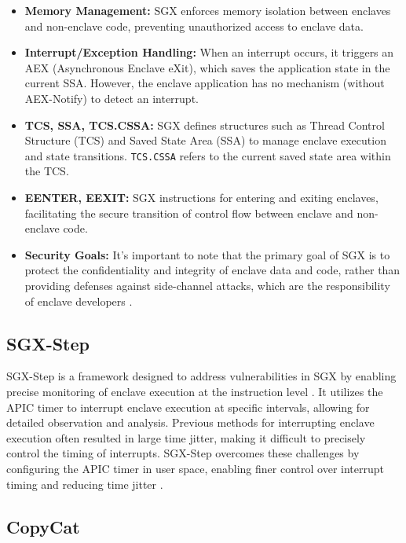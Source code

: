 \documentclass{llncs}
\begin{document}
\begin{itemize}
  \item \textbf{Memory Management:}
    SGX enforces memory isolation between enclaves and non-enclave code,
    preventing unauthorized access to enclave data.
  \item \textbf{Interrupt/Exception Handling:}
    When an interrupt occurs, it triggers an AEX (Asynchronous Enclave eXit),
    which saves the application state in the current SSA.
    However, the enclave application has no mechanism (without AEX-Notify) to detect an interrupt.
  \item \textbf{TCS, SSA, TCS.CSSA:}
    SGX defines structures such as Thread Control Structure (TCS) and Saved State Area (SSA)
    to manage enclave execution and state transitions.
    \texttt{TCS.CSSA} refers to the current saved state area within the TCS.
  \item \textbf{EENTER, EEXIT:}
    SGX instructions for entering and exiting enclaves,
    facilitating the secure transition of control flow between enclave and non-enclave code.
  \item \textbf{Security Goals:}
    It's important to note that the primary goal of SGX is to protect
    the confidentiality and integrity of enclave data and code,
    rather than providing defenses against side-channel attacks,
    which are the responsibility of enclave developers \cite{CostanD16}.
\end{itemize}

\subsection{SGX-Step}

SGX-Step is a framework designed to address vulnerabilities in SGX
by enabling precise monitoring of enclave execution at the instruction level \cite{ArnautovTGKMPLM16}.
It utilizes the APIC timer to interrupt enclave execution at specific intervals,
allowing for detailed observation and analysis.
Previous methods for interrupting enclave execution often resulted in large time jitter,
making it difficult to precisely control the timing of interrupts.
SGX-Step overcomes these challenges by configuring the APIC timer in user space,
enabling finer control over interrupt timing and reducing time jitter \cite{ArnautovTGKMPLM16}.


\subsection{CopyCat}
\end{document}
